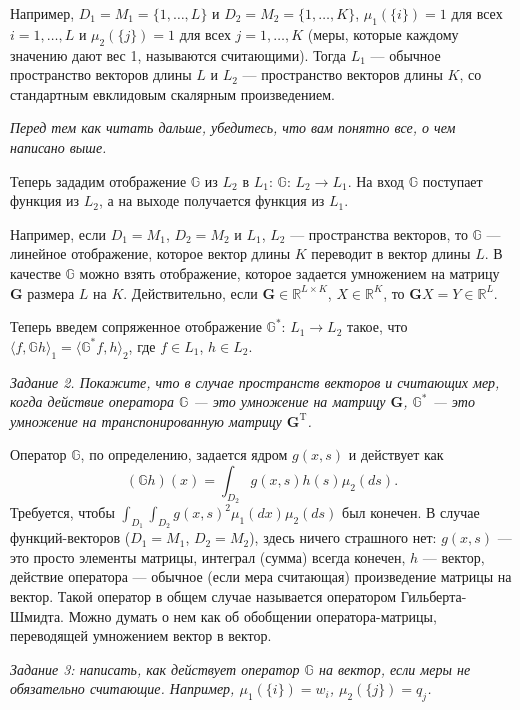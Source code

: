 \documentclass[12 pt]{article}
\begin{document}
Например, $D_1=M_1=\{1,\ldots,L\}$ и $D_2=M_2=\{1,\ldots,K\}$, $\mu_1(\{i\}) = 1$ для всех $i=1,\ldots,L$
и $\mu_2(\{j\}) = 1$ для всех $j=1,\ldots,K$ (меры, которые каждому значению дают вес 1, называются
считающими). Тогда $L_1$ --- обычное пространство векторов длины $L$
и $L_2$ --- пространство векторов длины $K$, со стандартным евклидовым скалярным произведением.

\textit{Перед тем как читать дальше, убедитесь, что вам понятно все, о чем написано выше.}

\medskip
Теперь зададим отображение $\mathbb{G}$ из $L_2$ в $L_1$: $\mathbb{G}:\, L_2 \rightarrow L_1$.
На вход $\mathbb{G}$ поступает функция из $L_2$, а  на выходе получается функция из $L_1$.

Например, если $D_1=M_1$, $D_2=M_2$ и $L_1$, $L_2$ --- пространства векторов, то $\mathbb{G}$ --- линейное отображение,
которое вектор длины $K$ переводит в вектор длины $L$.
В качестве $\mathbb{G}$ можно взять отображение, которое задается умножением на матрицу $\mathbf{G}$ размера $L$ на $K$.
Действительно, если $\mathbf{G}\in \mathbb{R}^{L\times K}$, $X\in \mathbb{R}^{K}$,
то $\mathbf{G} X = Y \in \mathbb{R}^{L}$.

Теперь введем сопряженное отображение $\mathbb{G}^*:\, L_1 \rightarrow L_2$ такое, что
$\langle f, \mathbb{G}h \rangle_1 = \langle \mathbb{G}^*f, h \rangle_2$, где $f\in L_1$,
$h\in L_2$.

\textit{Задание 2. Покажите, что в случае пространств векторов и считающих мер, когда действие оператора
$\mathbb{G}$ --- это умножение на матрицу $\mathbf{G}$,
$\mathbb{G}^*$ --- это умножение на транспонированную матрицу $\mathbf{G}^\mathrm{T}$.}

Оператор $\mathbb{G}$, по определению, задается ядром $g(x,s)$ и действует как
$$(\mathbb{G}h)(x) = \int_{D_2} g(x,s) h(s) \mu_2(ds).$$
Требуется, чтобы
$\int_{D_1}\int_{D_2} g(x,s)^2 \mu_1(dx) \mu_2(ds)$ был конечен. В случае функций-векторов ($D_1=M_1$, $D_2=M_2$),
здесь ничего страшного нет: $g(x,s)$ --- это просто элементы матрицы, интеграл (сумма) всегда конечен,
$h$ --- вектор, действие оператора --- обычное (если мера считающая) произведение матрицы на вектор.  Такой оператор
в общем случае называется оператором
Гильберта-Шмидта. Можно думать о нем как об обобщении оператора-матрицы, переводящей умножением вектор в вектор.

\textit{Задание 3: написать, как действует оператор $\mathbb{G}$ на вектор, если меры не обязательно считающие.
Например, $\mu_1(\{i\})=w_i$, $\mu_2(\{j\})=q_j$.}
\end{document}

